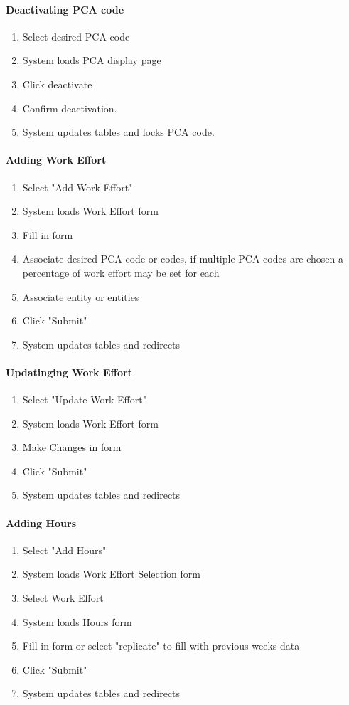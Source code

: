 \documentclass[letterpaper]{article}
\begin{document}
\paragraph{Deactivating PCA code}
\begin{enumerate}
\item Select desired PCA code
\item System loads PCA display page
\item Click deactivate
\item Confirm deactivation.
\item System updates tables and locks PCA code.
\end{enumerate}

\paragraph{Adding Work Effort}
\begin{enumerate}
\item Select "Add Work Effort"
\item System loads Work Effort form
\item Fill in form
\item Associate desired PCA code or codes, if multiple PCA codes are chosen a percentage of work effort may be set for each
\item Associate entity or entities
\item Click "Submit"
\item System updates tables and redirects
\end{enumerate}

\paragraph{Updatinging Work Effort}
\begin{enumerate}
\item Select "Update Work Effort"
\item System loads Work Effort form
\item Make Changes in form
\item Click "Submit"
\item System updates tables and redirects
\end{enumerate}

\paragraph{Adding Hours}
\begin{enumerate}
\item Select "Add Hours"
\item System loads Work Effort Selection form
\item Select Work Effort
\item System loads Hours form
\item Fill in form or select "replicate" to fill with previous weeks data
\item Click "Submit"
\item System updates tables and redirects
\end{enumerate}
\end{document}

